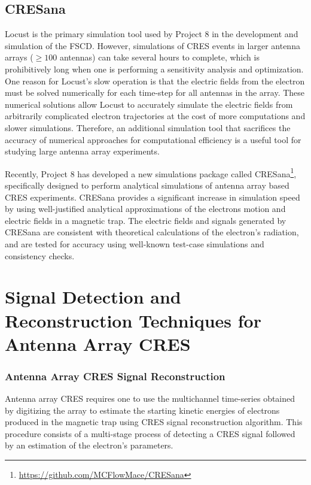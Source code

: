 \subsection{CRESana}
\label{sec:chap4-cresana}

Locust is the primary simulation tool used by Project 8 in the development and simulation of the FSCD. However, simulations of CRES events in larger antenna arrays ($\geq100$ antennas) can take several hours to complete, which is prohibitively long when one is performing a sensitivity analysis and optimization. One reason for Locust's slow operation is that the electric fields from the electron must be solved numerically for each time-step for all antennas in the array. These numerical solutions allow Locust to accurately simulate the electric fields from arbitrarily complicated electron trajectories at the cost of more computations and slower simulations. Therefore, an additional simulation tool that sacrifices the accuracy of numerical approaches for computational efficiency is a useful tool for studying large antenna array experiments.

Recently, Project 8 has developed a new simulations package called CRESana\footnote{\url{https://github.com/MCFlowMace/CRESana}}, specifically designed to perform analytical simulations of antenna array based CRES experiments. CRESana provides a significant increase in simulation speed by using well-justified analytical approximations of the electrons motion and electric fields in a magnetic trap. The electric fields and signals generated by CRESana are consistent with theoretical calculations of the electron's radiation, and are tested for accuracy using well-known test-case simulations and consistency checks. 

\section{Signal Detection and Reconstruction Techniques for Antenna Array CRES}
\label{sec:chap4-pter}

\subsubsection*{Antenna Array CRES Signal Reconstruction}

Antenna array CRES requires one to use the multichannel time-series obtained by digitizing the array to estimate the starting kinetic energies of electrons produced in the magnetic trap using CRES signal reconstruction algorithm. This procedure consists of a multi-stage process of detecting a CRES signal followed by an estimation of the electron's parameters.

